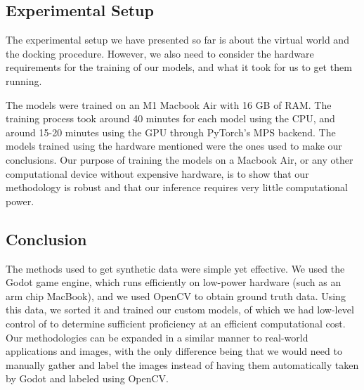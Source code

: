 \subsection{Experimental Setup}
The experimental setup we have presented so far is about the virtual world and the docking procedure. However, we also need to consider the hardware requirements for the training of our models, and what it took for us to get them running.

The models were trained on an M1 Macbook Air with 16 GB of RAM. The training process took around 40 minutes for each model using the CPU, and around 15-20 minutes using the GPU through PyTorch's MPS backend. The models trained using the hardware mentioned were the ones used to make our conclusions. Our purpose of training the models on a Macbook Air, or any other computational device without expensive hardware, is to show that our methodology is robust and that our inference requires very little computational power.

\subsection{Conclusion}
The methods used to get synthetic data were simple yet effective. We used the Godot game engine, which runs efficiently on low-power hardware (such as an arm chip MacBook), and we used OpenCV to obtain ground truth data. Using this data, we sorted it and trained our custom models, of which we had low-level control of to determine sufficient proficiency at an efficient computational cost. Our methodologies can be expanded in a similar manner to real-world applications and images, with the only difference being that we would need to manually gather and label the images instead of having them automatically taken by Godot and labeled using OpenCV.
